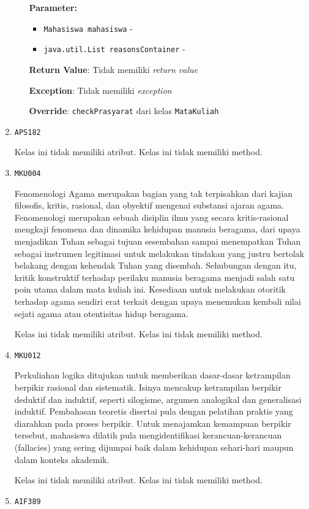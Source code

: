 \documentclass{article}
\begin{document}
\begin{enumerate}
\begin{itemize}
\textbf{Parameter:}
\begin{itemize}
\item \texttt{Mahasiswa mahasiswa} - 
\item \texttt{java.util.List reasonsContainer} - 
\end{itemize}
\textbf{Return Value}: Tidak memiliki \textit{return value}

\textbf{Exception}: Tidak memiliki \textit{exception}

\textbf{Override}: \texttt{checkPrasyarat} dari kelas \texttt{MataKuliah}

\end{itemize}
\item \texttt{APS182}



Kelas ini tidak memiliki atribut. Kelas ini tidak memiliki method. \item \texttt{MKU004}

Fenomenologi Agama merupakan bagian yang tak terpisahkan dari kajian filosofis, kritis, 
 rasional, dan obyektif mengenai substansi ajaran agama. Fenomenologi merupakan sebuah 
 disiplin ilmu yang secara kritis-rasional mengkaji fenomena dan dinamika kehidupan manusia 
 beragama, dari upaya menjadikan Tuhan sebagai tujuan sesembahan sampai menempatkan Tuhan 
 sebagai instrumen legitimasi untuk melakukan tindakan yang justru bertolak belakang dengan 
 kehendak Tuhan yang disembah. Sehubungan dengan itu, kritik konstruktif terhadap perilaku 
 manusia beragama menjadi salah satu poin utama dalam mata kuliah ini. Kesediaan untuk 
 melakukan otoritik terhadap agama sendiri erat terkait dengan upaya menemukan kembali nilai
 sejati agama atau otentisitas hidup beragama.

Kelas ini tidak memiliki atribut. Kelas ini tidak memiliki method. \item \texttt{MKU012}

Perkuliahan logika ditujukan untuk memberikan dasar-dasar ketrampilan berpikir rasional dan
 sistematik. Isinya mencakup ketrampilan berpikir deduktif dan induktif, seperti silogisme, 
 argumen analogikal dan generalisasi induktif. Pembahasan teoretis disertai pula dengan
 pelatihan praktis yang diarahkan pada proses berpikir. Untuk menajamkan kemampuan berpikir 
 tersebut, mahasiswa dilatih pula mengidentifikasi kerancuan-kerancuan (fallacies) yang sering 
 dijumpai baik dalam kehidupan sehari-hari maupun dalam konteks akademik.

Kelas ini tidak memiliki atribut. Kelas ini tidak memiliki method. \item \texttt{AIF389}




\end{enumerate}
\end{document}
